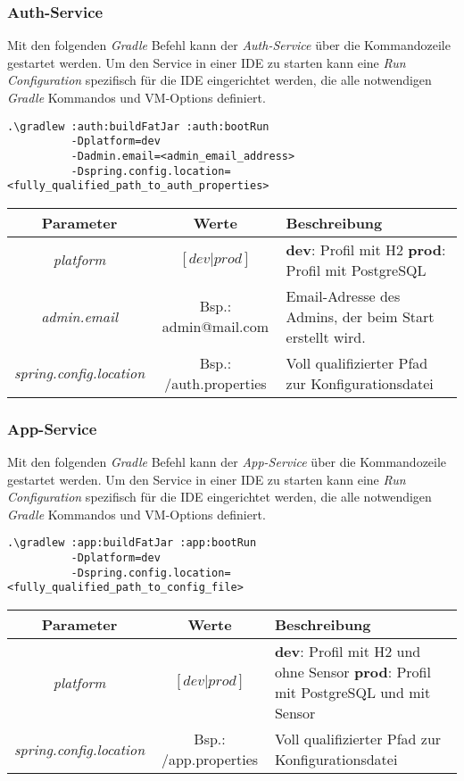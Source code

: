 \documentclass[]{article}
\begin{document}
{\subsubsection{Auth-Service}
Mit den folgenden \emph{Gradle} Befehl kann der \emph{Auth-Service} über die Kommandozeile gestartet werden. Um den Service in einer IDE zu starten kann eine \emph{Run Configuration} spezifisch für die IDE eingerichtet werden, die alle notwendigen \emph{Gradle} Kommandos und VM-Options definiert.
\begin{verbatim}
.\gradlew :auth:buildFatJar :auth:bootRun
          -Dplatform=dev
          -Dadmin.email=<admin_email_address>                
          -Dspring.config.location=<fully_qualified_path_to_auth_properties>
\end{verbatim}
{\renewcommand{\arraystretch}{2}%
\begin{center}
	\begin{tabular}{| c | c | p{8.3cm} |}
		\hline
		\textbf{Parameter} & \textbf{Werte} & \textbf{Beschreibung}  \\ \hline
		\textit{platform} & $[dev|prod]$ & \textbf{dev}: Profil mit H2 \newline
		\textbf{prod}: Profil mit PostgreSQL
		\\ \hline
		\textit{admin.email} & Bsp.: admin@mail.com & Email-Adresse des Admins, der beim Start erstellt wird. \\ \hline
		\textit{spring.config.location} & Bsp.: /auth.properties & Voll qualifizierter Pfad zur Konfigurationsdatei  \\ \hline
	\end{tabular}
\end{center}

\subsubsection{App-Service}
Mit den folgenden \emph{Gradle} Befehl kann der \emph{App-Service} über die Kommandozeile gestartet werden. Um den Service in einer IDE zu starten kann eine \emph{Run Configuration} spezifisch für die IDE eingerichtet werden, die alle notwendigen \emph{Gradle} Kommandos und VM-Options definiert.
\begin{verbatim}
.\gradlew :app:buildFatJar :app:bootRun
	      -Dplatform=dev              
	      -Dspring.config.location=<fully_qualified_path_to_config_file>
\end{verbatim}
{\renewcommand{\arraystretch}{2}%
\begin{center}
	\begin{tabular}{| c | c | p{8.3cm} |}
		\hline
		\textbf{Parameter} & \textbf{Werte} & \textbf{Beschreibung}  \\ \hline
		\textit{platform} & $[dev|prod]$ & \textbf{dev}: Profil mit H2 und ohne Sensor \newline
		\textbf{prod}: Profil mit PostgreSQL und mit Sensor \\ \hline
		\textit{spring.config.location} & Bsp.: /app.properties & Voll qualifizierter Pfad zur Konfigurationsdatei  \\ \hline
	\end{tabular}
\end{center}

}}}
\end{document}
